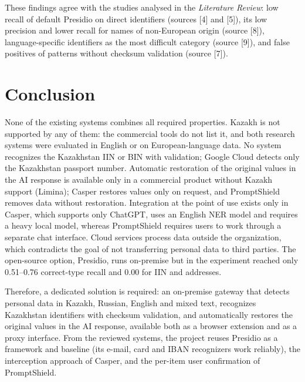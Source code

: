 \documentclass[12pt,a4paper]{article}
\begin{document}
These findings agree with the studies analysed in the \emph{Literature Review}: low recall of default Presidio on direct identifiers (sources [4] and [5]), its low precision and lower recall for names of non-European origin (source [8]), language-specific identifiers as the most difficult category (source [9]), and false positives of patterns without checksum validation (source [7]).

\section{Conclusion}

None of the existing systems combines all required properties. Kazakh is not supported by any of them: the commercial tools do not list it, and both research systems were evaluated in English or on European-language data. No system recognizes the Kazakhstan IIN or BIN with validation; Google Cloud detects only the Kazakhstan passport number. Automatic restoration of the original values in the AI response is available only in a commercial product without Kazakh support (Limina); Casper restores values only on request, and PromptShield removes data without restoration. Integration at the point of use exists only in Casper, which supports only ChatGPT, uses an English NER model and requires a heavy local model, whereas PromptShield requires users to work through a separate chat interface. Cloud services process data outside the organization, which contradicts the goal of not transferring personal data to third parties. The open-source option, Presidio, runs on-premise but in the experiment reached only 0.51--0.76 correct-type recall and 0.00 for IIN and addresses.

Therefore, a dedicated solution is required: an on-premise gateway that detects personal data in Kazakh, Russian, English and mixed text, recognizes Kazakhstan identifiers with checksum validation, and automatically restores the original values in the AI response, available both as a browser extension and as a proxy interface. From the reviewed systems, the project reuses Presidio as a framework and baseline (its e-mail, card and IBAN recognizers work reliably), the interception approach of Casper, and the per-item user confirmation of PromptShield.
\end{document}

